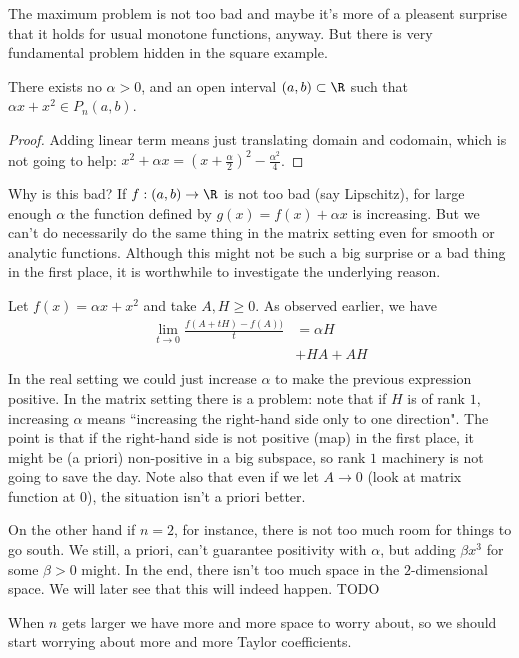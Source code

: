 The maximum problem is not too bad and maybe it's more of a pleasent surprise that it holds for usual monotone functions, anyway. But there is very fundamental problem hidden in the square example.

\begin{prop}
	There exists no $\alpha > 0$, and an open interval $(a, b) \subset \R$ such that $\alpha x + x^{2} \in P_{n}(a, b)$.
\end{prop}
\begin{proof}
	Adding linear term means just translating domain and codomain, which is not going to help: $x^2 + \alpha x = (x + \frac{\alpha}{2})^2 - \frac{\alpha^2}{4}$.
\end{proof}

Why is this bad? If $f : (a, b) \to \R$ is not too bad (say Lipschitz), for large enough $\alpha$ the function defined by $g(x) = f(x) + \alpha x$ is increasing. But we can't do necessarily do the same thing in the matrix setting even for smooth or analytic functions. Although this might not be such a big surprise or a bad thing in the first place, it is worthwhile to investigate the underlying reason.

Let $f(x) = \alpha x + x^2$ and take $A, H \geq 0$. As observed earlier, we have
\begin{align*}
	\lim_{t \to 0} \frac{f(A + t H) - f(A))}{t} &= \alpha H \\
	&+ H A + A H\\
\end{align*}
In the real setting we could just increase $\alpha$ to make the previous expression positive. In the matrix setting there is a problem: note that if $H$ is of rank $1$, increasing $\alpha$ means ``increasing the right-hand side only to one direction". The point is that if the right-hand side is not positive (map) in the first place, it might be (a priori) non-positive in a big subspace, so rank $1$ machinery is not going to save the day. Note also that even if we let $A \to 0$ (look at matrix function at $0$), the situation isn't a priori better.

On the other hand if $n = 2$, for instance, there is not too much room for things to go south. We still, a priori, can't guarantee positivity with $\alpha$, but adding $\beta x^3$ for some $\beta > 0$ might. In the end, there isn't too much space in the $2$-dimensional space. We will later see that this will indeed happen. TODO

When $n$ gets larger we have more and more space to worry about, so we should start worrying about more and more Taylor coefficients.

